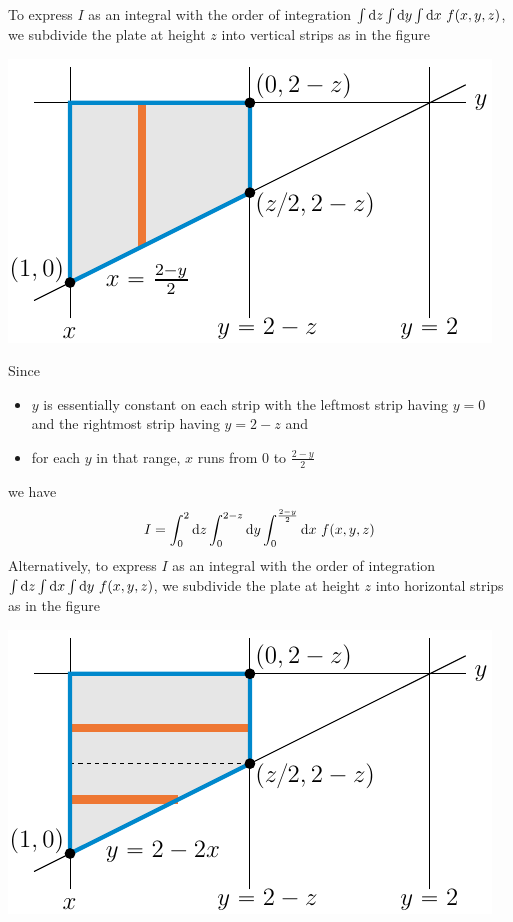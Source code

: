 \begin{eg}
\begin{wfig}
\end{wfig}
To express $I$ as an integral with the order of integration 
$\int\dee{z}\int\dee{y}\int\dee{x}\ f(x,y,z)$, we subdivide the plate at height $z$ into vertical strips as in the figure
\begin{efig}
\begin{center}
    \includegraphics{figures/integration/xchange3v.pdf}
\end{center}
\end{efig}
Since
\begin{itemize} \itemsep1pt \parskip0pt 
\item
$y$ is essentially constant on each strip with the leftmost strip having $y=0$ 
and the rightmost strip having $y=2-z$ and
\item
for each $y$ in that range, $x$ runs from $0$ to $\tfrac{2-y}{2}$
\end{itemize}
we have
\begin{equation*}
I=\int_0^2\dee{z}\int_0^{2-z}\dee{y}\int_0^{\frac{2-y}{2}}\dee{x}\ f(x,y,z)
\end{equation*}
Alternatively, to express $I$ as an integral with the order of integration 
$\int\dee{z}\int\dee{x}\int\dee{y}\ f(x,y,z)$, we subdivide the plate at height $z$ into horizontal strips as in the figure
\begin{efig}
\begin{center}
    \includegraphics{figures/integration/xchange3h.pdf}

\end{center}
\end{efig}
\end{eg}
